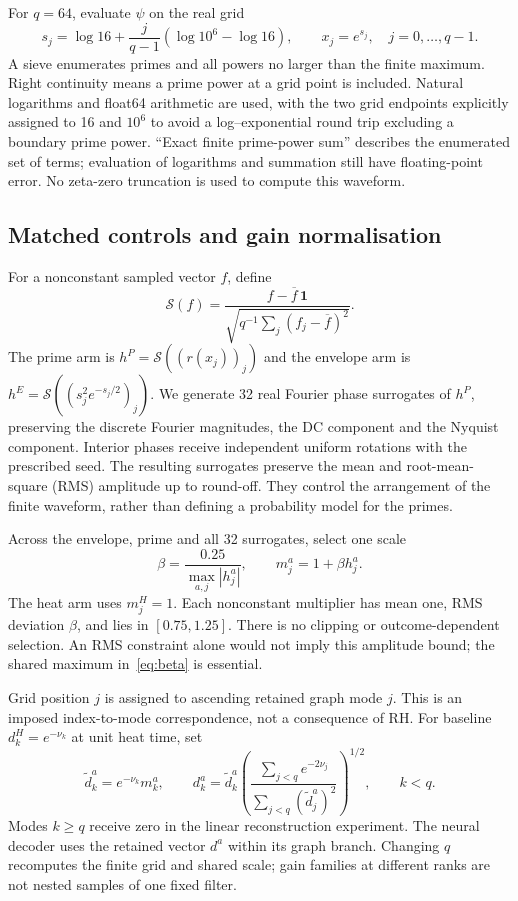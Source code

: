 \documentclass[10pt]{article}
\begin{document}
For $q=64$, evaluate $\psi$ on the real grid
\begin{equation}
 s_j=\log16+\frac{j}{q-1}(\log10^6-\log16),\qquad
 x_j=e^{s_j},\quad j=0,\ldots,q-1.
 \label{eq:grid}
\end{equation}
A sieve enumerates primes and all powers no larger than the finite
maximum. Right continuity means a prime power at a grid point is included.
Natural logarithms and float64 arithmetic are used, with the two
grid endpoints explicitly assigned to 16 and $10^6$ to avoid a
log--exponential round trip excluding a boundary prime power. ``Exact finite
prime-power sum'' describes the enumerated set of terms; evaluation of
logarithms and summation still have floating-point error. No zeta-zero
truncation is used to compute this waveform.

\subsection{Matched controls and gain normalisation}

For a nonconstant sampled vector $f$, define
\begin{equation}
 \mathcal S(f)=
 \frac{f-\overline f\,\mathbf1}
 {\sqrt{q^{-1}\sum_j(f_j-\overline f)^2}}.
 \label{eq:standardise}
\end{equation}
The prime arm is $h^{P}=\mathcal S((r(x_j))_j)$ and the envelope arm
is $h^{E}=\mathcal S((s_j^2e^{-s_j/2})_j)$. We generate 32 real Fourier
phase surrogates of $h^P$, preserving the discrete Fourier magnitudes,
the DC component and the Nyquist component. Interior phases receive
independent uniform rotations with the prescribed seed. The resulting
surrogates preserve the mean and root-mean-square (RMS) amplitude up to
round-off. They control the arrangement of the finite waveform, rather
than defining a probability model for the primes.

Across the envelope, prime and all 32 surrogates, select one scale
\begin{equation}
 \beta=\frac{0.25}{\max_{a,j}|h_j^a|},\qquad
 m_j^a=1+\beta h_j^a.
 \label{eq:beta}
\end{equation}
The heat arm uses $m_j^H=1$. Each nonconstant multiplier has mean one,
RMS deviation $\beta$, and lies in $[0.75,1.25]$. There is no clipping
or outcome-dependent selection. An RMS constraint alone would not imply
this amplitude bound; the shared maximum in~\eqref{eq:beta} is essential.

Grid position $j$ is assigned to ascending retained graph mode $j$.
This is an imposed index-to-mode correspondence, not a consequence of
RH. For baseline $d_k^H=e^{-\nu_k}$ at unit heat time, set
\begin{equation}
 \widetilde d_k^a=e^{-\nu_k}m_k^a,\qquad
 d_k^a=\widetilde d_k^a
 \left(\frac{\sum_{j<q}e^{-2\nu_j}}
 {\sum_{j<q}(\widetilde d_j^a)^2}\right)^{1/2},
 \qquad k<q.
 \label{eq:gains}
\end{equation}
Modes $k\geq q$ receive zero in the linear reconstruction experiment.
The neural decoder uses the retained vector $d^a$ within its graph
branch. Changing $q$ recomputes the finite grid and shared scale; gain
families at different ranks are not nested samples of one fixed filter.
\end{document}
